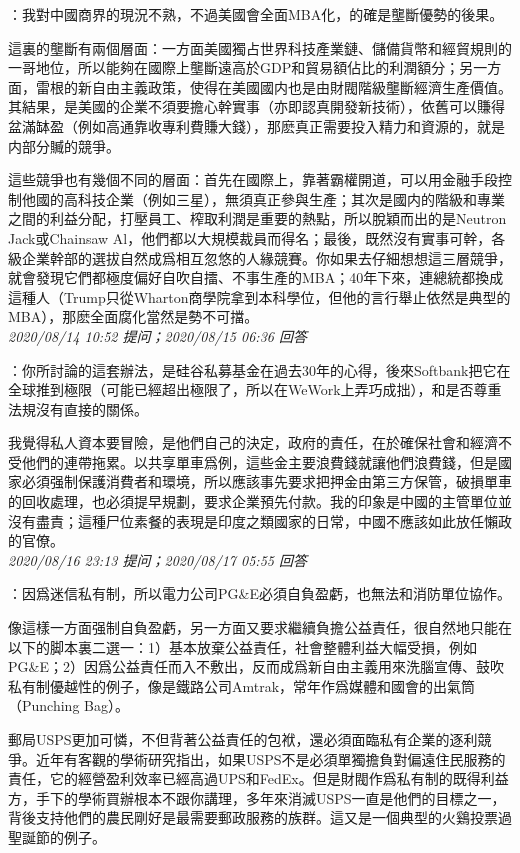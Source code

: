 \documentclass[twocolumn]{ctexart}
\begin{document}
：我對中國商界的現況不熟，不過美國會全面MBA化，的確是壟斷優勢的後果。

這裏的壟斷有兩個層面：一方面美國獨占世界科技產業鏈、儲備貨幣和經貿規則的一哥地位，所以能夠在國際上壟斷遠高於GDP和貿易額佔比的利潤額分；另一方面，雷根的新自由主義政策，使得在美國國内也是由財閥階級壟斷經濟生產價值。其結果，是美國的企業不須要擔心幹實事（亦即認真開發新技術），依舊可以賺得盆滿缽盈（例如高通靠收專利費賺大錢），那麽真正需要投入精力和資源的，就是内部分贓的競爭。

這些競爭也有幾個不同的層面：首先在國際上，靠著霸權開道，可以用金融手段控制他國的高科技企業（例如三星），無須真正參與生產；其次是國内的階級和專業之間的利益分配，打壓員工、榨取利潤是重要的熱點，所以脫穎而出的是Neutron Jack或Chainsaw Al，他們都以大規模裁員而得名；最後，既然沒有實事可幹，各級企業幹部的選拔自然成爲相互忽悠的人緣競賽。你如果去仔細想想這三層競爭，就會發現它們都極度偏好自吹自擂、不事生產的MBA；40年下來，連總統都換成這種人（Trump只從Wharton商學院拿到本科學位，但他的言行舉止依然是典型的MBA），那麽全面腐化當然是勢不可擋。
\\

\textit{\hfill\noindent\small 2020/08/14 10:52 提问；2020/08/15 06:36 回答}

：你所討論的這套辦法，是硅谷私募基金在過去30年的心得，後來Softbank把它在全球推到極限（可能已經超出極限了，所以在WeWork上弄巧成拙），和是否尊重法規沒有直接的關係。

我覺得私人資本要冒險，是他們自己的決定，政府的責任，在於確保社會和經濟不受他們的連帶拖累。以共享單車爲例，這些金主要浪費錢就讓他們浪費錢，但是國家必須强制保護消費者和環境，所以應該事先要求把押金由第三方保管，破損單車的回收處理，也必須提早規劃，要求企業預先付款。我的印象是中國的主管單位並沒有盡責；這種尸位素餐的表現是印度之類國家的日常，中國不應該如此放任懶政的官僚。
\\

\textit{\hfill\noindent\small 2020/08/16 23:13 提问；2020/08/17 05:55 回答}

：因爲迷信私有制，所以電力公司PG\&E必須自負盈虧，也無法和消防單位協作。

像這樣一方面强制自負盈虧，另一方面又要求繼續負擔公益責任，很自然地只能在以下的脚本裏二選一：1）基本放棄公益責任，社會整體利益大幅受損，例如PG\&E；2）因爲公益責任而入不敷出，反而成爲新自由主義用來洗腦宣傳、鼓吹私有制優越性的例子，像是鐵路公司Amtrak，常年作爲媒體和國會的出氣筒（Punching Bag）。

郵局USPS更加可憐，不但背著公益責任的包袱，還必須面臨私有企業的逐利競爭。近年有客觀的學術研究指出，如果USPS不是必須單獨擔負對偏遠住民服務的責任，它的經營盈利效率已經高過UPS和FedEx。但是財閥作爲私有制的既得利益方，手下的學術買辦根本不跟你講理，多年來消滅USPS一直是他們的目標之一，背後支持他們的農民剛好是最需要郵政服務的族群。這又是一個典型的火鷄投票過聖誕節的例子。
\end{document}
